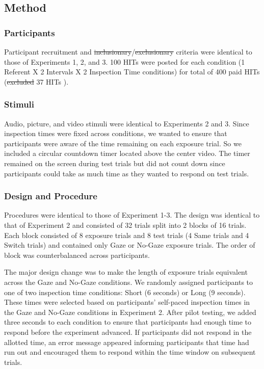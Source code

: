 \documentclass[authoryear, review]{elsarticle}
\providecommand{\DIFaddtex}[1]{{\protect\color{blue}\uwave{#1}}} %
\providecommand{\DIFdeltex}[1]{{\protect\color{red}\sout{#1}}}                      %
\providecommand{\DIFaddbegin}{} %
\providecommand{\DIFaddend}{} %
\providecommand{\DIFdelbegin}{} %
\providecommand{\DIFdelend}{} %
\providecommand{\DIFadd}[1]{\texorpdfstring{\DIFaddtex{#1}}{#1}} %
\providecommand{\DIFdel}[1]{\texorpdfstring{\DIFdeltex{#1}}{}} %
\begin{document}
\subsection{Method}\label{method-3}

\subsubsection{Participants}\label{participants-3}

Participant recruitment and \DIFdelbegin \DIFdel{inclusionary}\DIFdelend \DIFaddbegin \DIFadd{inclusion}\DIFaddend /\DIFdelbegin \DIFdel{exclusionary }\DIFdelend \DIFaddbegin \DIFadd{exclusion }\DIFaddend criteria were identical
to those of Experiments 1, 2, and 3. 100 HITs were posted for each
condition (1 Referent X 2 Intervals X 2 Inspection Time conditions) for
\DIFaddbegin \DIFadd{a }\DIFaddend total of 400 paid HITs (\DIFdelbegin \DIFdel{excluded }\DIFdelend 37 HITs \DIFaddbegin \DIFadd{excluded}\DIFaddend ).

\subsubsection{Stimuli}\label{stimuli-2}

Audio, picture, and video stimuli were identical to Experiments 2 and 3.
Since inspection times were fixed across conditions, we wanted to ensure
that participants were aware of the time remaining on each exposure
trial. So we included a circular countdown timer located above the
center video. The timer remained on the screen during test trials but
did not count down since participants could take as much time as they
wanted to respond on test trials.

\subsubsection{Design and Procedure}\label{design-and-procedure-3}

Procedures were identical to those of Experiment 1-3. The design was
identical to that of Experiment 2 and consisted of 32 trials split into
2 blocks of 16 trials. Each block consisted of 8 exposure trials and 8
test trials (4 Same trials and 4 Switch trials) and contained only Gaze
or No-Gaze exposure trials. The order of block was counterbalanced
across participants.

The major design change was to make the length of exposure trials
equivalent across the Gaze and No-Gaze conditions. We randomly assigned
participants to one of two inspection time conditions: Short (6 seconds)
or Long (9 seconds). These times were selected based on participants'
self-paced inspection times in the Gaze and No-Gaze conditions in
Experiment 2. After pilot testing, we added three seconds to each
condition to ensure that participants had enough time to respond before
the experiment advanced. If participants did not respond in the allotted
time, an error message appeared informing participants that time had run
out and encouraged them to respond within the time window on subsequent
trials.
\end{document}
